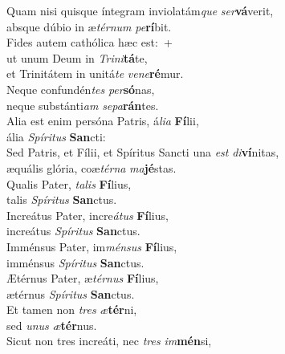 \evenverse Quam nisi quisque íntegram inviolatám\textit{que} \textit{ser}\textbf{vá}verit,~\*\\
\evenverse absque dúbio in æ\textit{tér}\textit{num} \textit{pe}\textbf{rí}bit.\\
\oddverse Fides autem cathólica hæc est:~+\\
\oddverse  ut unum Deum in \textit{Tri}\textit{ni}\textbf{tá}te,~\*\\
\oddverse et Trinitátem in unitá\textit{te} \textit{ve}\textit{ne}\textbf{ré}mur.\\
\evenverse Neque confundén\textit{tes} \textit{per}\textbf{só}nas,~\*\\
\evenverse neque substánti\textit{am} \textit{se}\textit{pa}\textbf{rán}tes.\\
\oddverse Alia est enim persóna Patris, á\textit{li}\textit{a} \textbf{Fí}lii,~\*\\
\oddverse ália \textit{Spí}\textit{ri}\textit{tus} \textbf{San}cti:\\
\evenverse Sed Patris, et Fílii, et Spíritus Sancti una \textit{est} \textit{di}\textbf{ví}nitas,~\*\\
\evenverse æquális glória, coæ\textit{tér}\textit{na} \textit{ma}\textbf{jé}stas.\\
\oddverse Qualis Pater, \textit{ta}\textit{lis} \textbf{Fí}lius,~\*\\
\oddverse talis \textit{Spí}\textit{ri}\textit{tus} \textbf{San}ctus.\\
\evenverse Increátus Pater, incre\textit{á}\textit{tus} \textbf{Fí}lius,~\*\\
\evenverse increátus \textit{Spí}\textit{ri}\textit{tus} \textbf{San}ctus.\\
\oddverse Imménsus Pater, im\textit{mén}\textit{sus} \textbf{Fí}lius,~\*\\
\oddverse imménsus \textit{Spí}\textit{ri}\textit{tus} \textbf{San}ctus.\\
\evenverse Ætérnus Pater, æ\textit{tér}\textit{nus} \textbf{Fí}lius,~\*\\
\evenverse ætérnus \textit{Spí}\textit{ri}\textit{tus} \textbf{San}ctus.\\
\oddverse Et tamen non \textit{tres} \textit{æ}\textbf{tér}ni,~\*\\
\oddverse sed \textit{u}\textit{nus} \textit{æ}\textbf{tér}nus.\\
\evenverse Sicut non tres increáti, nec \textit{tres} \textit{im}\textbf{mén}si,~\*\\
